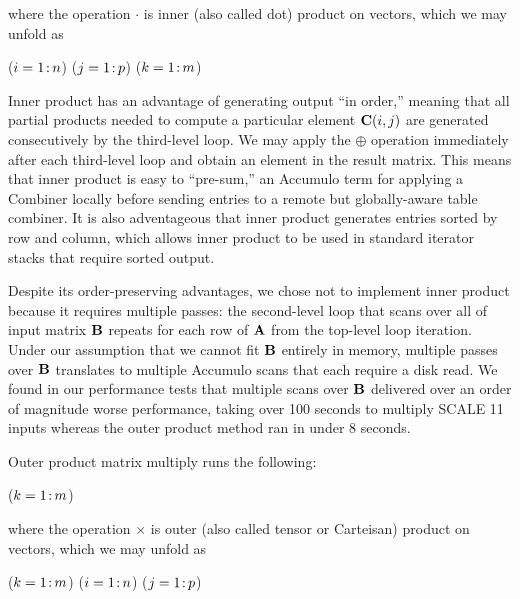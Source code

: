 \noindent where the operation $\cdot$ is inner (also called dot) product on vectors, which we may unfold as
\begin{algorithm}[h]
\fore($i = 1\colon\! n$){
\fore($j = 1\colon\! p$){
\fore($k = 1\colon\! m$){
}}}
\end{algorithm}

Inner product has an advantage of generating output ``in order,'' meaning that all partial products needed 
to compute a particular element $\mathbf{C}(i,j)$ are generated consecutively by the third-level loop.
We may apply the $\oplus$ operation immediately after each third-level loop and obtain an element in the result matrix.
This means that inner product is easy to ``pre-sum,'' an Accumulo term for applying a Combiner
locally before sending entries to a remote but globally-aware table combiner.
It is also adventageous that inner product generates entries sorted by row 
and column, which allows inner product to be used in standard iterator stacks that require sorted output.

Despite its order-preserving advantages, we chose not to implement inner product 
because it requires multiple passes:
the second-level loop that scans over all of input matrix $\mathbf{B}$
repeats for each row of $\mathbf{A}$ from the top-level loop iteration.
Under our assumption that we cannot fit $\mathbf{B}$ entirely in memory,
multiple passes over $\mathbf{B}$ translates to multiple Accumulo scans that each require a disk read.
We found in our performance tests that multiple scans over $\mathbf{B}$ 
delivered over an order of magnitude worse performance, taking over 100 seconds to multiply SCALE 11 inputs
whereas the outer product method ran in under 8 seconds.

Outer product matrix multiply runs the following:
\begin{algorithm}
\fore($k = 1\colon\! m$){
}
\end{algorithm}

\noindent where the operation $\times$ is outer (also called tensor or Carteisan) product on vectors, which we may unfold as
\begin{algorithm}
\fore($k = 1\colon\! m$){
\fore($i = 1\colon\! n$){
\fore($j = 1\colon\! p$){
}}}
\end{algorithm}

